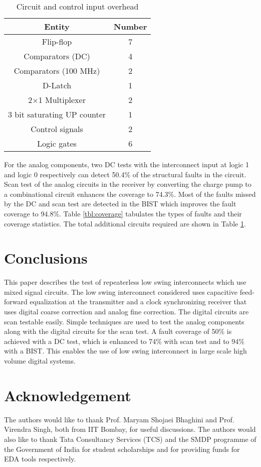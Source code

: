 \documentclass[conference]{IEEEtran}
\begin{document}
\begin{table}[h]
\begin{center}
\caption{Circuit and control input overhead}
\label{tbl:ckt-overhead}
\begin{tabular}{|c|c|}
\hline
Entity & Number \\ \hline
Flip-flop & 7 \\
Comparators (DC) & 4 \\
Comparators (100 MHz) & 2 \\
D-Latch & 1 \\
2$\times$1 Multiplexer & 2 \\
3 bit saturating UP counter & 1 \\
Control signals & 2 \\
Logic gates & 6 \\ \hline
\end{tabular}
\end{center}
\end{table}

For the analog components, two DC tests with the interconnect input at logic 1 and
logic 0 respectively can detect 50.4\% of the structural faults in the circuit.
Scan test of the analog circuits in the receiver by converting the charge pump
to a combinational circuit enhances the coverage to 74.3\%. Most of the faults 
missed by the DC and scan test are detected in the BIST which improves
the fault coverage to 94.8\%. Table \ref{tbl:coverage} tabulates the types 
of faults and their coverage statistics. The total additional circuits required are shown in Table \ref{tbl:ckt-overhead}.


\section{Conclusions}
This paper describes the test of repeaterless low swing interconnects which
use mixed signal circuits. The low swing interconnect considered uses
capacitive feed-forward equalization at the transmitter and 
a clock synchronizing  receiver that uses digital coarse correction 
and analog fine correction. The digital circuits are scan testable easily.
Simple techniques are used to test the analog 
components along with the digital circuits for the scan test. 
A fault coverage of 50\% is achieved with a DC test, which is 
enhanced to 74\% with scan test and to 94\% with a BIST.
This enables the use of low swing interconnect
in large scale high volume digital systems.


\section*{Acknowledgement}
The authors would like to thank Prof. Maryam Shojaei Bhaghini and
Prof. Virendra Singh, both from IIT Bombay, for useful discussions. 
The authors would also like to thank Tata Consultancy Services (TCS)
and the SMDP programme of the Government of India for student scholarships
and for providing funds for EDA tools respectively.



\end{document}
